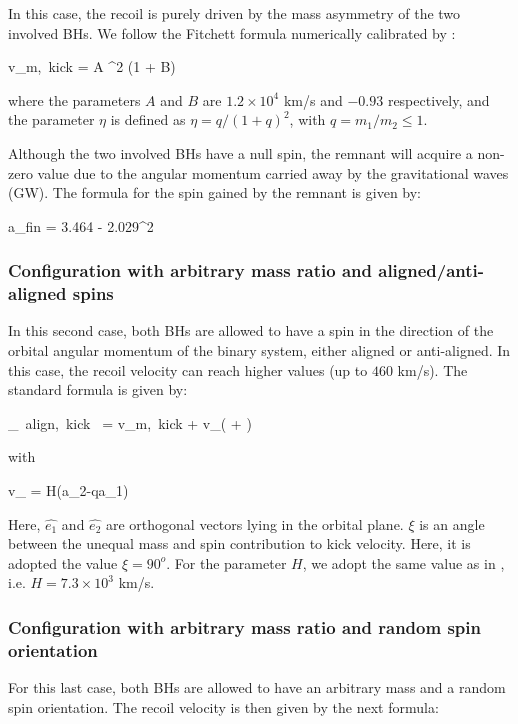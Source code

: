 \documentclass[a4,useAMS,usenatbib,usegraphicx,12pt]{article}
\begin{document}
In this case, the recoil is purely driven by the mass asymmetry of the two involved BHs. We follow
the Fitchett formula numerically calibrated by \citet{Gonzales2007}:

{v_{\mbox{\tiny{m, kick}}} = A \eta^2  (1 + B\eta)}

where the parameters $A$ and $B$ are $1.2\times 10^4$ km/s and $-0.93$ respectively, and the parameter
$\eta$ is defined as $\eta = q/(1+q)^2$, with $q = m_1/m_2\leq 1$.

Although the two involved BHs have a null spin, the remnant will acquire a non-zero value due to 
the angular momentum carried away by the gravitational waves (GW). The formula for the spin gained by
the remnant is given by:

{ a_{\mbox{\tiny{fin}}} = 3.464 \eta - 2.029\eta^2 }

\subsubsection{Configuration with arbitrary mass ratio and aligned/anti-aligned spins}

In this second case, both BHs are allowed to have a spin in the direction of the orbital angular 
momentum of the binary system, either aligned or anti-aligned. In this case, the recoil velocity 
can reach higher values (up to $460$ km/s). The standard formula is given by:

{ _{\mbox{\tiny{ align, kick }}} = v_{\mbox{\tiny{m, kick}}}  + 
v_{\bot}( \cos{\xi} + \sin{\xi} ) }

with 

{ v_{\bot} = H(a_2-qa_1) }

Here, $\hat{e_1}$ and $\hat{e_2}$ are orthogonal vectors lying in the orbital plane. $\xi$ is an 
angle between the unequal mass and spin contribution to kick velocity. Here, it is adopted the value
$\xi = 90^o$. For the parameter $H$, we adopt the same value as in \citet{Campanelli2007}, i.e. 
$H = 7.3 \times 10^3$ km/s.

\subsubsection{Configuration with arbitrary mass ratio and random spin orientation}

For this last case, both BHs are allowed to have an arbitrary mass and a random spin orientation. 
The recoil velocity is then given by the next formula:
\end{document}
